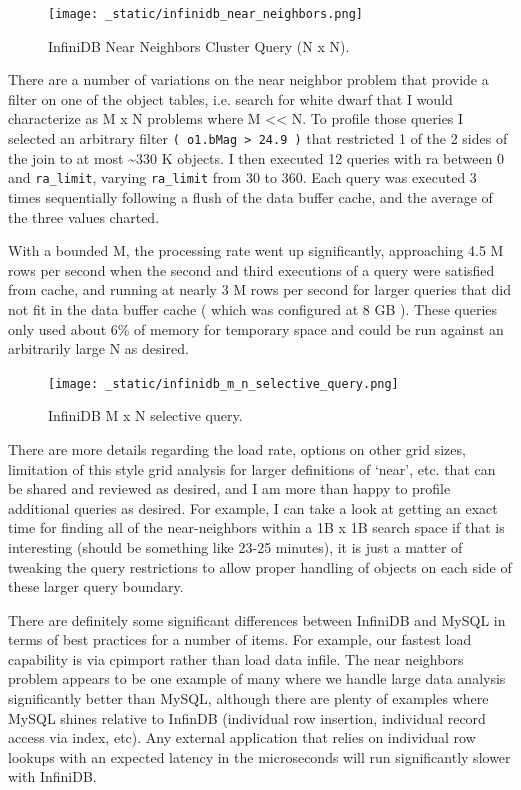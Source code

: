\documentclass[DM,lsstdraft,toc]{lsstdoc}
\begin{document}
\begin{figure}[H]
\centering
\texttt{[image: \_static/infinidb\_near\_neighbors.png]}
\caption{InfiniDB Near Neighbors Cluster Query (N x N).}
\end{figure}

There are a number of variations on the near neighbor problem that
provide a filter on one of the object tables, i.e. search for white
dwarf that I would characterize as M x N problems where M
\textless{}\textless{} N. To profile those queries I selected an
arbitrary filter \texttt{(\ o1.bMag\ \textgreater{}\ 24.9\ )} that
restricted 1 of the 2 sides of the join to at most \textasciitilde{}330
K objects. I then executed 12 queries with ra between 0 and
\texttt{ra\_limit}, varying \texttt{ra\_limit} from 30 to 360. Each
query was executed 3 times sequentially following a flush of the data
buffer cache, and the average of the three values charted.

With a bounded M, the processing rate went up significantly, approaching
4.5 M rows per second when the second and third executions of a query
were satisfied from cache, and running at nearly 3 M rows per second for
larger queries that did not fit in the data buffer cache ( which was
configured at 8 GB ). These queries only used about 6\% of memory for
temporary space and could be run against an arbitrarily large N as
desired.

\begin{figure}[H]
\centering
\texttt{[image: \_static/infinidb\_m\_n\_selective\_query.png]}
\caption{InfiniDB M x N selective query.}
\end{figure}

There are more details regarding the load rate, options on other grid
sizes, limitation of this style grid analysis for larger definitions of
`near', etc. that can be shared and reviewed as desired, and I am more
than happy to profile additional queries as desired. For example, I can
take a look at getting an exact time for finding all of the
near-neighbors within a 1B x 1B search space if that is interesting
(should be something like 23-25 minutes), it is just a matter of
tweaking the query restrictions to allow proper handling of objects on
each side of these larger query boundary.

There are definitely some significant differences between InfiniDB and
MySQL in terms of best practices for a number of items. For example, our
fastest load capability is via cpimport rather than load data infile.
The near neighbors problem appears to be one example of many where we
handle large data analysis significantly better than MySQL, although
there are plenty of examples where MySQL shines relative to InfinDB
(individual row insertion, individual record access via index, etc). Any
external application that relies on individual row lookups with an
expected latency in the microseconds will run significantly slower with
InfiniDB.
\end{document}
